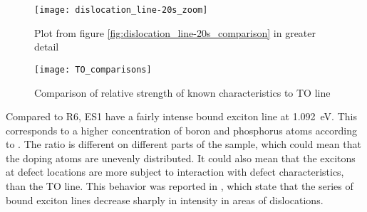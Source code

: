 \begin{figure}[H]
\centering
\texttt{[image: dislocation\_line-20s\_zoom]}
\caption[Comparisons in a dislocation line]{Plot from figure \ref{fig:dislocation_line-20s_comparison} in greater detail}
\label{fig:dislocation_line-20s_zoom_comparison}%
\end{figure}

\begin{figure}[H]
\centering
\texttt{[image: TO\_comparisons]}
\caption[Comparison or relative strength]{Comparison of relative strength of known characteristics to TO line}
\label{fig:TO_comparisons}%
\end{figure}




Compared to R6, ES1 have a fairly intense bound exciton line at 1.092~eV. This corresponds to a higher concentration of boron and phosphorus atoms according to \cite{tajima78}. The ratio is different on different parts of the sample, which could mean that the doping atoms are unevenly distributed. It could also mean that the excitons at defect locations are more subject to interaction with defect characteristics, than the TO line. This behavior was reported in \cite{drozdov76}, which state that the series of bound exciton lines decrease sharply in intensity in areas of dislocations.